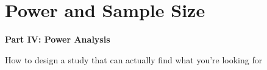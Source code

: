 \documentclass[aspectratio=169]{beamer}
\begin{document}
\section{Power and Sample Size}

\begin{frame}
\begin{center}
  \vspace{1.5cm}
  {\Huge\bfseries\textcolor{popblue}{Part IV: Power Analysis}}

  \vspace{0.8cm}
  {\large How to design a study that can actually find what you're looking for}
\end{center}
\end{frame}
\end{document}
